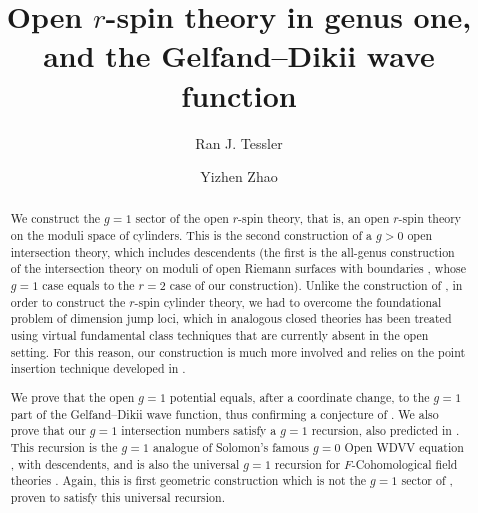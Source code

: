 \documentclass[11pt]{amsart}
\title{%
Open $r$-spin theory in genus one, and the Gelfand--Dikii wave function%
}
\date{}
\author{Ran J. Tessler \and Yizhen Zhao}
\theoremstyle{definition}
\theoremstyle{remark}
\newcommand{\<}{\left<}
\renewcommand{\>}{\right>}
\numberwithin{equation}{section}
\begin{document}
\maketitle
\begin{abstract}
We construct the $g=1$ sector of the open $r$-spin theory, that is, an open $r$-spin theory on the moduli space of cylinders. This is the second construction of a $g>0$ open intersection theory, which includes descendents (the first is %
the all-genus construction %
of the intersection theory on moduli of open Riemann surfaces with boundaries \cite{PST14,Tes15}, whose $g=1$ case equals to the $r=2$ case of our construction). Unlike the construction of \cite{Tes15}, in order to construct the $r$-spin %
cylinder theory, we %
had to overcome the foundational problem of dimension jump loci, which in analogous closed theories has been treated using virtual fundamental %
class techniques that %
are currently absent in the open setting. For %
this reason, our %
construction is much %
more involved and %
relies on the point insertion technique %
developed in \cite{TZ1,TZ2}.


We %
prove that the open $g=1$ potential equals, after a coordinate change, to the $g=1$ part of the Gelfand--Dikii wave function, thus confirming a conjecture of \cite{BCT3}.
We also prove that our $g=1$ intersection numbers satisfy a $g=1$ recursion, also %
predicted in \cite{BCT3,gomez2021open}. This %
recursion is the $g=1$ analogue of Solomon's famous $g=0$ Open WDVV equation \cite{sol_owdvv}, with descendents, and is also the universal $g=1$ recursion for $F$-Cohomological field theories \cite{alexandrov2023construction}.
Again, this is first geometric construction which is not the $g=1$ sector of \cite{PST14,Tes15}, proven to satisfy this universal recursion.
\end{abstract}
\end{document}
